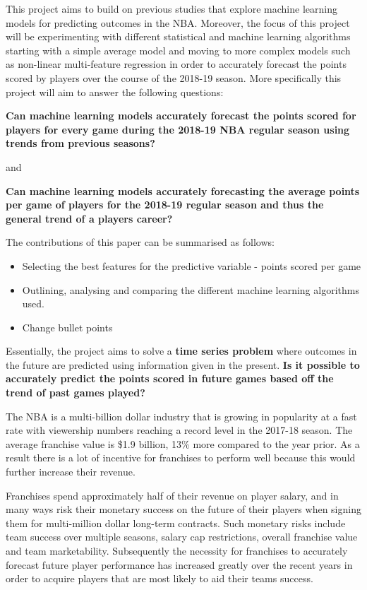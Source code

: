\documentclass[a4paper,11pt,twoside]{article}
\begin{document}
This project aims to build on previous studies that explore machine learning models for predicting outcomes in the NBA. Moreover, the focus of this project will be experimenting with different statistical and machine learning algorithms starting with a simple average model and moving to more complex models such as non-linear multi-feature regression in order to accurately forecast the points scored by players over the course of the 2018-19 season. More specifically this project will aim to answer the following questions:

\begin{center}
\textbf{Can machine learning models accurately forecast the points scored for players for every game during the 2018-19 NBA regular season using trends from previous seasons?}

and 

\textbf{Can machine learning models accurately forecasting the average points per game of players for the 2018-19 regular season and thus the general trend of a players career?}
\end{center}
\vspace{7mm}

The contributions of this paper can be summarised as follows:
\begin{itemize}
    \item Selecting the best features for the predictive variable - points scored per game
    \item Outlining, analysing and comparing the different machine learning algorithms used.
    \item Change bullet points
\end{itemize}
Essentially, the project aims to solve a \textbf{time series problem} where outcomes in the future are predicted using information given in the present. \textbf{Is it possible to accurately predict the points scored in future games based off the trend of past games played?}

The NBA is a multi-billion dollar industry that is growing in popularity at a fast rate with viewership numbers reaching a record level in the 2017-18 season. The average franchise value is \$1.9 billion, 13\% more compared to the year prior. As a result there is a lot of incentive for franchises to perform well because this would further increase their revenue.

Franchises spend approximately half of their revenue on player salary, and in many ways risk their monetary success on the future of their players when signing them for multi-million dollar long-term contracts. Such monetary risks include team success over multiple seasons, salary cap restrictions, overall franchise value and team marketability. Subsequently the necessity for franchises to accurately forecast future player performance has increased greatly over the recent years in order to acquire players that are most likely to aid their teams success.
\end{document}
